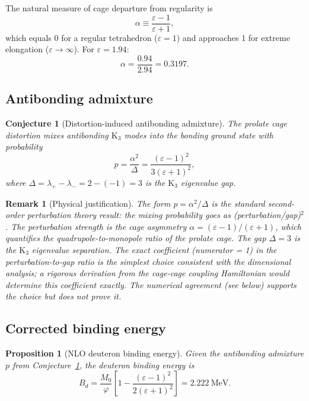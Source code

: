 \documentclass[11pt,letterpaper]{article}
\newtheorem{proposition}[theorem]{Proposition}
\newtheorem{conjecture}[theorem]{Conjecture}
\newtheorem{remark}[theorem]{Remark}
\newcommand{\phig}{\varphi}
\newcommand{\Kthree}{\mathrm{K}_3}
\newcommand{\Mzero}{M_0}
\newcommand{\Bd}{B_d}
\newcommand{\epscage}{\varepsilon}
\begin{document}
The natural measure of cage departure from regularity is
\begin{equation}
\alpha \equiv \frac{\epscage - 1}{\epscage + 1},
\label{eq:asym}
\end{equation}
which equals 0 for a regular tetrahedron ($\epscage = 1$)
and approaches 1 for extreme elongation
($\epscage \to \infty$).  For $\epscage = 1.94$:
\begin{equation}
\alpha = \frac{0.94}{2.94} = 0.3197.
\label{eq:asym_num}
\end{equation}

\subsection{Antibonding admixture}

\begin{conjecture}[Distortion-induced antibonding admixture]
\label{conj:admixture}
The prolate cage distortion mixes antibonding $\Kthree$ modes
into the bonding ground state with probability
\begin{equation}
p = \frac{\alpha^2}{\Delta}
= \frac{(\epscage-1)^2}{3(\epscage+1)^2},
\label{eq:p_admixture}
\end{equation}
where $\Delta = \lambda_+ - \lambda_- = 2 - (-1) = 3$ is the
$\Kthree$ eigenvalue gap.
\end{conjecture}

\begin{remark}[Physical justification]
\label{rem:PT}
The form $p = \alpha^2/\Delta$ is the standard second-order
perturbation theory result: the mixing probability goes as
(perturbation/gap)$^2$.  The perturbation strength is the
cage asymmetry $\alpha = (\epscage - 1)/(\epscage + 1)$,
which quantifies the quadrupole-to-monopole ratio of the
prolate cage.  The gap $\Delta = 3$ is the $\Kthree$
eigenvalue separation.  The exact coefficient (numerator = 1)
in the perturbation-to-gap ratio is the simplest choice
consistent with the dimensional analysis; a rigorous
derivation from the cage-cage coupling Hamiltonian would
determine this coefficient exactly.  The numerical agreement
(see below) supports the choice but does not prove it.
\end{remark}

\subsection{Corrected binding energy}

\begin{proposition}[NLO deuteron binding energy]
\label{prop:NLO}
Given the antibonding admixture $p$ from
Conjecture~\ref{conj:admixture}, the deuteron binding energy
is
\begin{equation}
\boxed{
\Bd = \frac{\Mzero}{\phig}
\left[1 - \frac{(\epscage-1)^2}{2(\epscage+1)^2}\right]
= 2.222~\text{MeV}.
}
\label{eq:Bd_NLO}
\end{equation}
\end{proposition}
\end{document}
